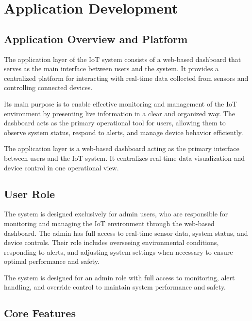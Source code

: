 \section{Application Development}

\subsection{Application Overview and Platform}

The application layer of the IoT system consists of a web-based dashboard that serves as the main interface between users and the system. It provides a centralized platform for interacting with real-time data collected from sensors and controlling connected devices.

Its main purpose is to enable effective monitoring and management of the IoT environment by presenting live information in a clear and organized way. The dashboard acts as the primary operational tool for users, allowing them to observe system status, respond to alerts, and manage device behavior efficiently.

The application layer is a web-based dashboard acting as the primary interface between users and the IoT system. It centralizes real-time data visualization and device control in one operational view.


\subsection{User Role}

The system is designed exclusively for admin users, who are responsible for monitoring and managing the IoT environment through the web-based dashboard. The admin has full access to real-time sensor data, system status, and device controls. Their role includes overseeing environmental conditions, responding to alerts, and adjusting system settings when necessary to ensure optimal performance and safety.

The system is designed for an admin role with full access to monitoring, alert handling, and override control to maintain system performance and safety.


\subsection{Core Features}

